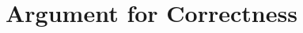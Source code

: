 
\begin{comment}
\begin{code}
import Prelude hiding (($),(/))
import Data.List

infixr 1  $
infixr 0  ==>
(==>) :: Bool -> Bool -> Bool
($) :: (a -> b) -> a -> b

type FuncName = String
type CtorName = String
type VarName = String

freeVars :: Expr -> [String]
body   :: FuncName  -> Expr
args   :: FuncName  -> [VarName]
argsN :: FuncName -> [Int]
var    :: VarName   -> Either ArgPos (Expr, Selector)
ctors  :: CtorName  -> [CtorName]
type Selector  =  (CtorName, Int)
type ArgPos    =  Int

precond   :: FuncName -> Prop (Sat ArgPos)
prePost   :: FuncName -> Constraint -> Prop (Sat ArgPos)
pre ::  Expr -> Prop (Sat Expr)
reduce    :: Prop (Sat Expr) -> Prop (Sat ArgPos)
red :: Expr -> Constraint -> Prop (Sat ArgPos)
substP ::  [alpha] -> Prop (Sat ArgPos) -> Prop (Sat alpha)

data Sat alpha = Sat alpha Constraint

(-<)  :: alpha -> [CtorName] -> Prop (Sat alpha)
(|>)  :: Selector -> Constraint -> Constraint
(<|)  :: CtorName -> Constraint -> Prop (Sat ArgPos)

data Prop alpha
instance Eq a => Eq (Prop a)

propAnd, propOr           :: Prop alpha -> Prop alpha -> Prop alpha
propAnds, propOrs         :: [Prop alpha] -> Prop alpha
propMap                   :: (alpha -> Prop beta) -> Prop alpha -> Prop beta
propTrue, propFalse       :: Prop alpha
propBool                  :: Bool -> Prop alpha
propLit                   :: alpha -> Prop alpha

data Constraint = Constraint

class Subst a b c where (/) :: a -> b -> c
class SubstNum a b c where (/#) :: a -> b -> c

instance Subst Expr ([VarName], [Expr]) Expr
\end{code}
\end{comment}


\section{Argument for Correctness}
\label{secC:correct}

